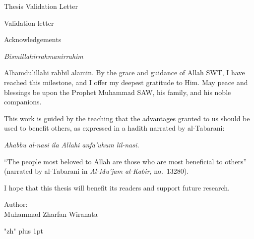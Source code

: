 \documentclass[12pt, twoside, openright]{book}
\begin{document}
\newpage
\mbox{}
\thispagestyle{empty}
\newpage
{}



\begin{center}
	{\chinnesesize Thesis Validation Letter}
\end{center}
Validation letter
\newpage
\mbox{}
\newpage


{}
\begin{center}
	{\chinnesesize Acknowledgements}
\end{center}
\begin{center}
	\textit{Bismillahirrahmanirrahim}
\end{center}

Alhamdulillahi rabbil alamin. By the grace and guidance of Allah SWT, I have reached this milestone, and I offer my deepest gratitude to Him. May peace and blessings be upon the Prophet Muhammad SAW, his family, and his noble companions.

This work is guided by the teaching that the advantages granted to us should be used to benefit others, as expressed in a hadith narrated by al-Tabarani:

\begin{center}
	\textit{Ahabbu al-nasi ila Allahi anfa'uhum lil-nasi.}
\end{center}


``The people most beloved to Allah are those who are most beneficial to others'' (narrated by al-Tabarani in
\textit{Al-Mu'jam al-Kabir}, no.~13280).

I hope that this thesis will benefit its readers and support future research.

\noindent
Author:\\[1em]
Muhammad Zharfan Wiranata

\newpage
\mbox{}
\newpage




{}
\begin{center}
	{\chinnesesize {}}
\end{center}
\begingroup
\XeTeXlinebreaklocale "zh"
\XeTeXlinebreakskip=0pt plus 1pt
\setlength{\parskip}{0.5em}
\end{document}
